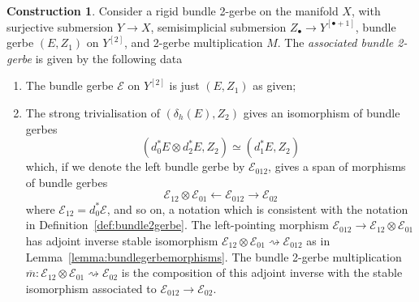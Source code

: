 \documentclass[12pt]{amsart}
\theoremstyle{plain}
\theoremstyle{definition}
\newtheorem{construction}[theorem]{Construction}
\theoremstyle{remark}
\numberwithin{equation}{section}
\newcommand{\cE}{{\mathcal E}}
\newcommand{\<}{\langle}
\renewcommand{\>}{\rangle}
\begin{document}
\begin{construction}\label{constr:associated_b2g}
Consider a rigid bundle 2-gerbe on the manifold $X$, with surjective submersion $Y\to X$, semisimplicial submersion $Z_\bullet\to Y^{[\bullet+1]}$, bundle gerbe $(E,Z_1)$ on $Y^{[2]}$, and 2-gerbe multiplication $M$. 
The \emph{associated bundle 2-gerbe} is given by the following data

\begin{enumerate}

\item The bundle gerbe $\cE$ on $Y^{[2]}$ is just $(E,Z_1)$ as given;

\item The strong trivialisation of $(\delta_h(E),Z_2)$ gives an isomorphism of bundle gerbes
\[
	(d_0^*E\otimes d_2^*E,Z_2) \simeq (d_1^*E,Z_2)
\] 
which, if we denote the left bundle  gerbe by $\cE_{012}$, gives a span of morphisms of bundle gerbes 
\[
	\cE_{12}\otimes \cE_{01} \leftarrow \cE_{012} \to \cE_{02}
\] 
where $\cE_{12} = d_0^*\cE$, and so on, a notation which is consistent with the notation in Definition~\ref{def:bundle2gerbe}. 
The left-pointing morphism $\cE_{012}\to \cE_{12}\otimes \cE_{01}$ has adjoint inverse stable isomorphism $\cE_{12}\otimes \cE_{01} \rightsquigarrow \cE_{012} $ as in Lemma~\ref{lemma:bundlegerbemorphisms}. 
The bundle 2-gerbe multiplication $\overline{m}\colon \cE_{12}\otimes \cE_{01} \rightsquigarrow\cE_{02}$ is the composition of this adjoint inverse with the stable isomorphism associated to $\cE_{012} \to \cE_{02}$.





\end{enumerate}
\end{construction}
\end{document}
